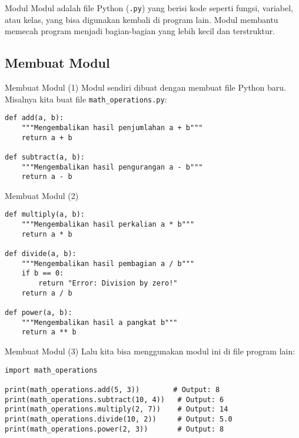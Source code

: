 \documentclass[aspectratio=169, table]{beamer}
\begin{document}
\begin{frame}[fragile]{Modul}
Modul adalah file Python (\texttt{.py}) yang berisi kode seperti fungsi, variabel, atau kelas, yang bisa digunakan kembali di program lain. Modul membantu memecah program menjadi bagian-bagian yang lebih kecil dan terstruktur.
\end{frame}

\subsection{Membuat Modul}

\begin{frame}[fragile]{Membuat Modul (1)}
Modul sendiri dibuat dengan membuat file Python baru. Misalnya kita buat file \texttt{math_operations.py}:

\begin{lstlisting}[style=PythonStyle, caption={Kode Python: math_operations.py}]
def add(a, b):
    """Mengembalikan hasil penjumlahan a + b"""
    return a + b

def subtract(a, b):
    """Mengembalikan hasil pengurangan a - b"""
    return a - b
\end{lstlisting}
\end{frame}

\begin{frame}[fragile]{Membuat Modul (2)}
\begin{lstlisting}[style=PythonStyle, caption={Kode Python: math_operations.py}]
def multiply(a, b):
    """Mengembalikan hasil perkalian a * b"""
    return a * b

def divide(a, b):
    """Mengembalikan hasil pembagian a / b"""
    if b == 0:
        return "Error: Division by zero!"
    return a / b

def power(a, b):
    """Mengembalikan hasil a pangkat b"""
    return a ** b
\end{lstlisting}
\end{frame}

\begin{frame}[fragile]{Membuat Modul (3)}
Lalu kita bisa menggunakan modul ini di file program lain:

\begin{lstlisting}[style=PythonStyle, caption={Kode Python: calculator.py}]
import math_operations

print(math_operations.add(5, 3))        # Output: 8
print(math_operations.subtract(10, 4))   # Output: 6
print(math_operations.multiply(2, 7))    # Output: 14
print(math_operations.divide(10, 2))     # Output: 5.0
print(math_operations.power(2, 3))       # Output: 8
\end{lstlisting}
    
\end{frame}
\end{document}
